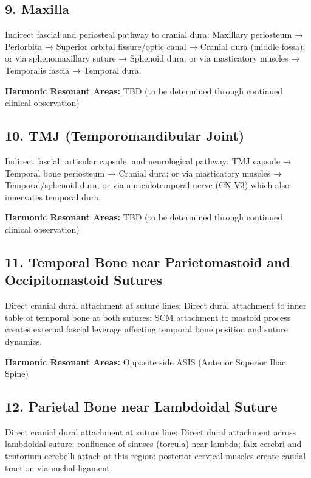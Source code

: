 \documentclass[11pt,letterpaper]{article}
\begin{document}
\subsection{9. Maxilla}

Indirect fascial and periosteal pathway to cranial dura: Maxillary periosteum → Periorbita → Superior orbital fissure/optic canal → Cranial dura (middle fossa); or via sphenomaxillary suture → Sphenoid dura; or via masticatory muscles → Temporalis fascia → Temporal dura.


\textbf{Harmonic Resonant Areas:} TBD (to be determined through continued clinical observation)


\subsection{10. TMJ (Temporomandibular Joint)}

Indirect fascial, articular capsule, and neurological pathway: TMJ capsule → Temporal bone periosteum → Cranial dura; or via masticatory muscles → Temporal/sphenoid dura; or via auriculotemporal nerve (CN V3) which also innervates temporal dura.


\textbf{Harmonic Resonant Areas:} TBD (to be determined through continued clinical observation)


\subsection{11. Temporal Bone near Parietomastoid and Occipitomastoid Sutures}

Direct cranial dural attachment at suture lines: Direct dural attachment to inner table of temporal bone at both sutures; SCM attachment to mastoid process creates external fascial leverage affecting temporal bone position and suture dynamics.


\textbf{Harmonic Resonant Areas:} Opposite side ASIS (Anterior Superior Iliac Spine)


\subsection{12. Parietal Bone near Lambdoidal Suture}

Direct cranial dural attachment at suture line: Direct dural attachment across lambdoidal suture; confluence of sinuses (torcula) near lambda; falx cerebri and tentorium cerebelli attach at this region; posterior cervical muscles create caudal traction via nuchal ligament.
\end{document}
